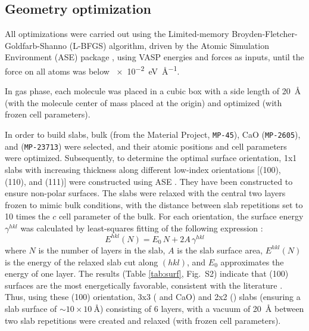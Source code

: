 \documentclass[%
aip,
amsmath,amssymb,
preprint,%
jcp,
showkeys,
]{revtex4-2}
\begin{document}
\subsection{Geometry optimization} 
All optimizations were carried out using the Limited-memory Broyden-Fletcher-Goldfarb-Shanno  (L-BFGS) algorithm, driven by the Atomic Simulation Environment (ASE) package \cite{larsenAtomicSimulationEnvironment2017}, using VASP energies and forces as inputs, until the force on all atoms was below \SI{e-2}{\electronvolt\per\angstrom}.

In gas phase, each molecule was placed in a cubic box with a side length of \SI{20}{\angstrom} (with the molecule center of mass placed at the origin) and optimized (with frozen cell parameters).

In order to build slabs, bulk  (from the Material Project, \texttt{MP-45}), CaO (\texttt{MP-2605}), and  (\texttt{MP-23713}) were selected, and their atomic positions and cell parameters were optimized. Subsequently, to determine the optimal surface orientation, 1x1 slabs with increasing thickness along different low-index orientations [(100), (110), and (111)] were constructed using ASE \cite{larsenAtomicSimulationEnvironment2017}. They have been constructed to ensure non-polar surfaces. The slabs were relaxed with the central two layers frozen to mimic bulk conditions, with the distance between slab repetitions set to 10 times the $c$ cell parameter of the bulk. For each orientation, the surface energy $\gamma^{hkl}$ was calculated by least-squares fitting of the following expression \cite{sunEfficientCreationConvergence2013,tranSurfaceEnergiesElemental2016}:
\begin{equation}
	E^{hkl}(N) = E_0\,N + 2A\,\gamma^{hkl} \label{eq:surf}
\end{equation}
where $N$ is the number of layers in the slab, $A$ is the slab surface area, $E^{hkl}(N)$ is the energy of the relaxed slab cut along $(hkl)$, and $E_0$ approximates the energy of one layer. The results (Table \ref{tab:surf}, Fig.~S2) indicate that (100) surfaces are the most energetically favorable, consistent with the literature \cite{deleeuwDensityFunctionalTheory2000,ebadiInsightsLiMetalOrganic2019}. 
Thus, using these (100) orientation, 3x3 ( and CaO) and 2x2 () slabs (ensuring a slab surface of $\sim 10\times \SI{10}{\angstrom}$) consisting of 6 layers, with a vacuum of \SI{20}{\angstrom} between two slab repetitions were created and relaxed (with frozen cell parameters). 
\end{document}

